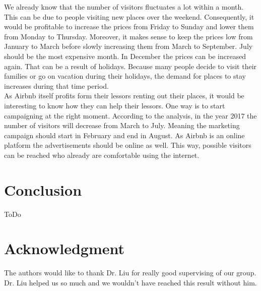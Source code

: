 \documentclass[journal]{IEEEtran}
\begin{document}
We already know that the number of visitors fluctuates a lot within a month. This can be due to people visiting new places over the weekend. Consequently, it would be profitable to increase the prices from Friday to Sunday and lower them from Monday to Thursday. Moreover, it makes sense to keep the prices low from January to March before slowly increasing them from March to September. July should be the most expensive month. In December the prices can be increased again. That can be a result of holidays. Because many people decide to visit their families or go on vacation during their holidays, the demand for places to stay increases during that time period. \\
As Airbnb itself profits form their lessors renting out their places, it would be interesting to know how they can help their lessors. One way is to start campaigning at the right moment. According to the analysis, in the year 2017 the number of visitors will decrease from March to July. Meaning the marketing campaign should start in February and end in August. As Airbnb is an online platform the advertisements should be online as well. This way, possible visitors can be reached who already are comfortable using the internet. 

%
\section{Conclusion}
ToDo



\section*{Acknowledgment}
The authors would like to thank Dr. Liu for really good supervising of our group. Dr. Liu helped us so much and we wouldn't have reached this result without him. 




%
\end{document}
